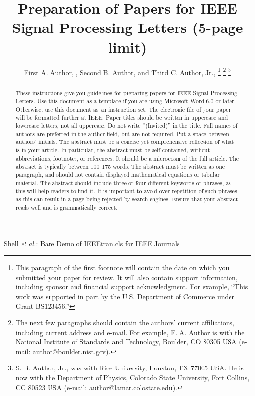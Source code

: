 \documentclass[journal]{IEEEtran}
\begin{document}
\title{Preparation of Papers for IEEE Signal Processing Letters (5-page limit)}

\author{First A. Author, , Second B. Author, and Third C. Author, Jr., 
\thanks{This paragraph of the first footnote will contain the date on which you submitted your paper for review. It will also contain support information, including sponsor and financial support acknowledgment. For example, ``This work was supported in part by the U.S. Department of Commerce under Grant BS123456.'' }
\thanks{The next few paragraphs should contain the authors' current affiliations, including current address and e-mail. For example, F. A. Author is with the National Institute of Standards and Technology, Boulder, CO 80305 USA (e-mail: author@boulder.nist.gov).}
\thanks{S. B. Author, Jr., was with Rice University, Houston, TX 77005 USA. He is now with the Department of Physics, Colorado State University, Fort Collins, CO 80523 USA (e-mail: author@lamar.colostate.edu).}}

{Shell \MakeLowercase{\textit{et al.}}: Bare Demo of IEEEtran.cls for IEEE Journals}
\maketitle

\begin{abstract}
These instructions give you guidelines for preparing papers for IEEE Signal Processing Letters. Use this document as a template if you are using Microsoft Word 6.0 or later. Otherwise, use this document as an instruction set. The electronic file of your paper will be formatted further at IEEE. Paper titles should be written in uppercase and lowercase letters, not all uppercase. Do not write ``(Invited)'' in the title. Full names of authors are preferred in the author field, but are not required. Put a space between authors’ initials. The abstract must be a concise yet comprehensive reflection of what is in your article. In particular, the abstract must be self-contained, without abbreviations, footnotes, or references. It should be a microcosm of the full article. The abstract is typically between 100--175 words. The abstract must be written as one paragraph, and should not contain displayed mathematical equations or tabular material. The abstract should include three or four different keywords or phrases, as this will help readers to find it. It is important to avoid over-repetition of such phrases as this can result in a page being rejected by search engines. Ensure that your abstract reads well and is grammatically correct.
\end{abstract}
\end{document}

